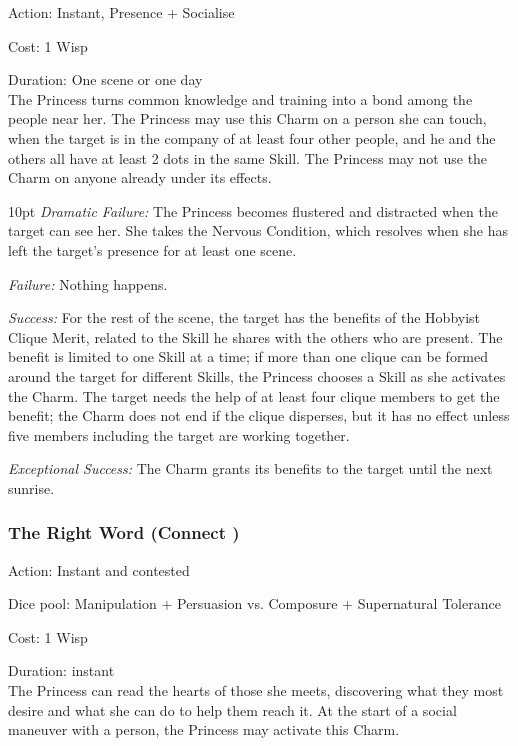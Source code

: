 \noindent Action: Instant, Presence + Socialise 

\noindent Cost: 1 Wisp

\noindent Duration: One scene or one day \\

\noindent The Princess turns common knowledge and training into a bond among the people near her. The Princess may use this Charm on a person she can touch, when the target is in the company of at least four other people, and he and the others all have at least 2 dots in the same Skill. The Princess may not use the Charm on anyone already under its effects.

\begin{myindentpar}{10pt}
    \emph{Dramatic Failure:} The Princess becomes flustered and distracted when the target can see her. She takes the Nervous Condition, which resolves when she has left the target’s presence for at least one scene.
    
    \emph{Failure:} Nothing happens. 
    
    \emph{Success:} For the rest of the scene, the target has the benefits of the Hobbyist Clique Merit, related to the Skill he shares with the others who are present. The benefit
is limited to one Skill at a time; if more than one clique can be formed around the target for different Skills, the Princess chooses a Skill as she activates the Charm. The target needs the help of at least four clique members to get the benefit; the Charm does not end if the clique disperses, but it has no effect unless five members including the target are working together.
    
    \emph{Exceptional Success:} The Charm grants its benefits to the target until the next sunrise.
\end{myindentpar}

\subsubsection*{The Right Word (Connect \textbullet\textbullet)}

\noindent Action: Instant and contested

\noindent Dice pool: Manipulation + Persuasion vs. Composure + Supernatural Tolerance

\noindent Cost: 1 Wisp

\noindent Duration: instant\\

The Princess can read the hearts of those she meets, discovering what they most desire and what she can do to help them reach it. At the start of a social maneuver with a person, the Princess may activate this Charm.

